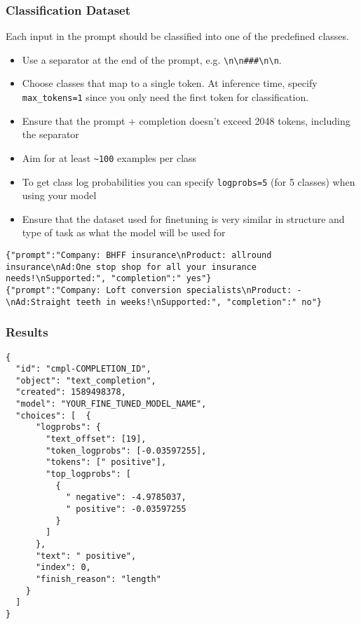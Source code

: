 \begin{frame}[fragile]\frametitle{Classification Dataset}

Each input in the prompt should be classified into one of the predefined classes. 
\begin{itemize}
\item Use a separator at the end of the prompt, e.g. \lstinline|\n\n###\n\n|. 
\item Choose classes that map to a single token. At inference time, specify  \lstinline|max_tokens=1| since you only need the first token for classification.
\item Ensure that the prompt + completion doesn't exceed 2048 tokens, including the separator
\item Aim for at least  \lstinline|~100| examples per class
\item To get class log probabilities you can specify \lstinline|logprobs=5| (for 5 classes) when using your model
\item Ensure that the dataset used for finetuning is very similar in structure and type of task as what the model will be used for
\end{itemize}	 


\begin{lstlisting}
{"prompt":"Company: BHFF insurance\nProduct: allround insurance\nAd:One stop shop for all your insurance needs!\nSupported:", "completion":" yes"}
{"prompt":"Company: Loft conversion specialists\nProduct: -\nAd:Straight teeth in weeks!\nSupported:", "completion":" no"}
\end{lstlisting}	
\end{frame}


\begin{frame}[fragile]\frametitle{Results}
\begin{lstlisting}
{
  "id": "cmpl-COMPLETION_ID",
  "object": "text_completion",
  "created": 1589498378,
  "model": "YOUR_FINE_TUNED_MODEL_NAME",
  "choices": [  {
      "logprobs": {
        "text_offset": [19],
        "token_logprobs": [-0.03597255],
        "tokens": [" positive"],
        "top_logprobs": [
          {
            " negative": -4.9785037,
            " positive": -0.03597255
          }
        ]
      },
      "text": " positive",
      "index": 0,
      "finish_reason": "length"
    }
  ]
}
\end{lstlisting}		

\end{frame}


